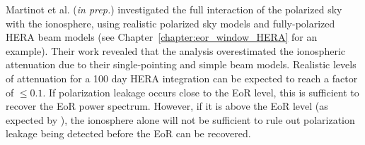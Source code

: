 Martinot et al. (\textit{in prep.}) investigated the full interaction of the polarized sky with the ionosphere, using realistic polarized sky models and fully-polarized HERA beam models (see Chapter~\ref{chapter:eor_window_HERA} for an example). Their work revealed that the \cite{Moore.17} analysis overestimated the ionospheric attenuation due to their single-pointing and simple beam models. Realistic levels of attenuation for a 100 day HERA integration can be expected to reach a factor of $\leqslant 0.1$. If polarization leakage occurs close to the EoR level, this is sufficient to recover the EoR power spectrum. However, if it is above the EoR level (as expected by \citealt{Nunhokee.17}), the ionosphere alone will not be sufficient to rule out polarization leakage being detected before the EoR can be recovered.
